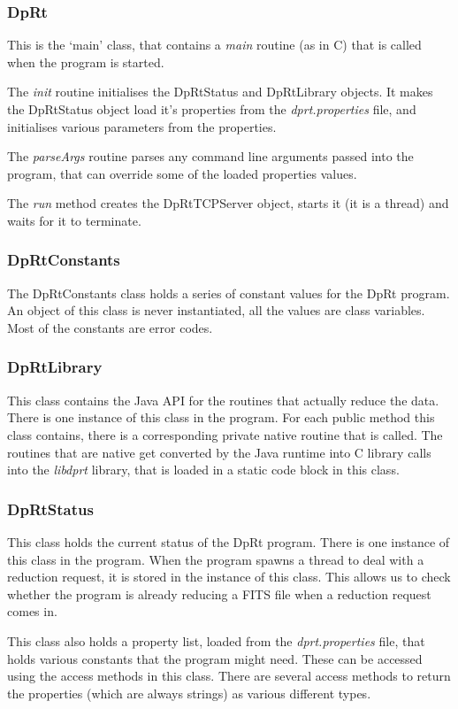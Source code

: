 \documentclass[10pt,a4paper]{article}
\begin{document}
\subsubsection{DpRt}
This is the `main' class, that contains a {\em main} routine (as in C) that is called when the program is started.

The {\em init} routine initialises the DpRtStatus and DpRtLibrary objects. It makes the DpRtStatus object
load it's properties from the {\em dprt.properties} file, and initialises various parameters from the properties.

The {\em parseArgs} routine parses any command line arguments passed into the program, that can override some
of the loaded properties values.

The {\em run} method creates the DpRtTCPServer object, starts it (it is a thread) and waits for it to terminate.

\subsubsection{DpRtConstants}
The DpRtConstants class holds a series of constant values for the DpRt program. An object of this class is never
instantiated, all the values are class variables. Most of the constants are error codes.

\subsubsection{DpRtLibrary}
This class contains the Java API for the routines that actually reduce the data. 
There is one instance of this class in the program. For each public method this
class contains, there is a corresponding private native routine that is called. The routines that are native 
get converted by the Java runtime into C library calls into the {\em libdprt} library, 
that is loaded in a static code block in this class.

\subsubsection{DpRtStatus}
This class holds the current status of the DpRt program. There is one instance of this class in the program.
When the program spawns a thread to deal with a 
reduction request, it is stored in the instance of this class. This allows us to check whether the 
program is already reducing a FITS file when a reduction request comes in.

This class also holds a property list, loaded from the {\em dprt.properties} file, that holds various
constants that the program might need. These can be accessed using the access methods in this class.
There are several access methods to return the properties (which are always strings) as various different
types.
\end{document}
